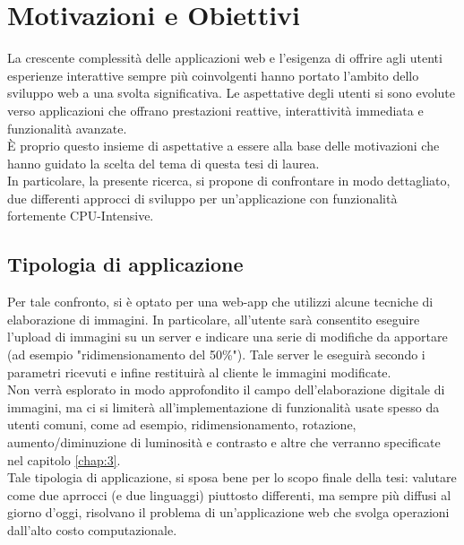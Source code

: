\section{Motivazioni e Obiettivi}
\label{sec:Obiettivi}
La crescente complessità delle applicazioni web e l'esigenza di offrire agli utenti esperienze interattive sempre più coinvolgenti hanno portato l'ambito dello sviluppo web a una svolta significativa.
Le aspettative degli utenti si sono evolute verso applicazioni che offrano prestazioni reattive, interattività immediata e funzionalità avanzate.
\\È proprio questo insieme di aspettative a essere alla base delle motivazioni che hanno guidato la scelta del tema di questa tesi di laurea.
\\In particolare, la presente ricerca, si propone di confrontare in modo dettagliato, due differenti approcci di sviluppo per un'applicazione con funzionalità fortemente CPU-Intensive.
\subsection{Tipologia di applicazione}
Per tale confronto, si è optato per una web-app che utilizzi alcune tecniche di elaborazione di immagini.
In particolare, all'utente sarà consentito eseguire l'upload di immagini su un server e indicare una serie di modifiche da apportare (ad esempio "ridimensionamento del 50\%"). Tale server le eseguirà secondo i parametri ricevuti e infine restituirà al cliente le immagini modificate.
\\Non verrà esplorato in modo approfondito il campo dell'elaborazione digitale di immagini, ma ci si limiterà all'implementazione di funzionalità usate spesso da utenti comuni, come ad esempio, ridimensionamento, rotazione, aumento/diminuzione di luminosità e contrasto e altre che verranno specificate nel capitolo \ref{chap:3}.
\\Tale tipologia di applicazione, si sposa bene per lo scopo finale della tesi: valutare come due aprrocci (e due linguaggi) piuttosto differenti, ma sempre più diffusi al giorno d'oggi, risolvano il problema di un'applicazione web che svolga operazioni dall'alto costo computazionale.
